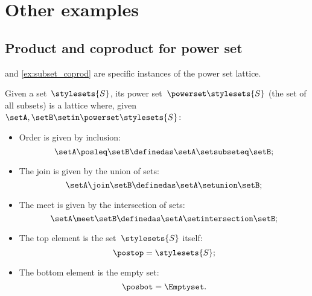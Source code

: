 
\section{Other examples}

\subsection{Product and coproduct for power set}
 and \cref{ex:subset_coprod} are specific instances of the power set lattice.

\begin{ctdefinition}
    \label{def:power-set-as-lattice}
    Given a set~$\stylesets{S}$, its power set~$\powerset \stylesets{S}$ (the set of all subsets) is a lattice where, given~$\setA,\setB\setin \powerset \stylesets{S}$:
    \begin{itemize}
        \item Order is given by inclusion:
              \begin{equation}
                  \setA\posleq \setB \definedas \setA\setsubseteq \setB;
              \end{equation}
        \item The join is given by the union of sets:
              \begin{equation}
                  \setA\join \setB \definedas \setA\setunion \setB;
              \end{equation}
        \item The meet is given by the intersection of sets:
              \begin{equation}
                  \setA\meet \setB \definedas \setA\setintersection \setB;
              \end{equation}
        \item The top element is the set~$\stylesets{S}$ itself:
              \begin{equation}
                  \postop = \stylesets{S};
              \end{equation}
        \item The bottom element is the empty set:
              \begin{equation}
                  \posbot = \Emptyset.
              \end{equation}
    \end{itemize}
\end{ctdefinition}

